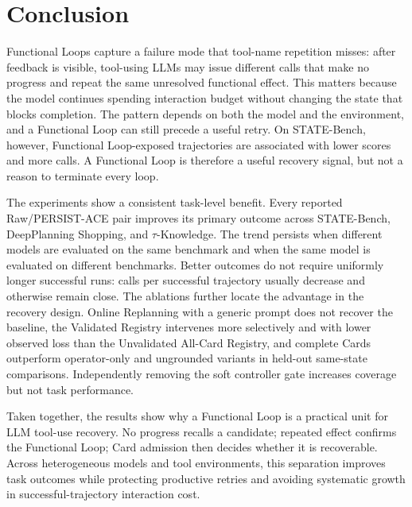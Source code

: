 \section{Conclusion}

Functional Loops capture a failure mode that tool-name repetition misses:
after feedback is visible, tool-using LLMs may issue different calls that make no
progress and repeat the same unresolved functional effect. This matters because
the model continues spending interaction budget without changing the state
that blocks completion. The pattern depends on both the model and the
environment, and a Functional Loop can still precede a useful retry. On STATE-Bench,
however, Functional Loop-exposed trajectories are associated with lower scores and more
calls. A Functional Loop is therefore a useful recovery signal, but not a reason to
terminate every loop.

The experiments show a consistent task-level benefit. Every reported
Raw/PERSIST-ACE pair improves its primary outcome across STATE-Bench,
DeepPlanning Shopping, and $\tau$-Knowledge. The trend persists when different
models are evaluated on the same benchmark and when the same model is evaluated
on different benchmarks. Better outcomes do not require uniformly longer successful runs:
calls per successful trajectory usually decrease and otherwise remain close.
The ablations further locate the advantage in the recovery design. Online
Replanning with a generic prompt does not recover the baseline, the Validated Registry intervenes
more selectively and with lower observed loss than the Unvalidated All-Card
Registry, and complete Cards outperform operator-only and ungrounded variants
in held-out same-state comparisons. Independently removing the soft controller
gate increases coverage but not task performance.

Taken together, the results show why a Functional Loop is a practical unit for LLM tool-use
recovery. No progress recalls a candidate; repeated effect confirms the Functional Loop;
Card admission then decides whether it is recoverable. Across heterogeneous
models and tool environments, this separation improves task outcomes while
protecting productive retries and avoiding systematic growth in
successful-trajectory interaction cost.

